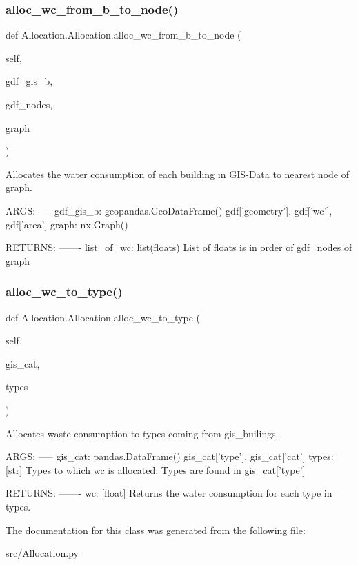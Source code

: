 \subsubsection{\texorpdfstring{alloc\+\_\+wc\+\_\+from\+\_\+b\+\_\+to\+\_\+node()}{alloc\_wc\_from\_b\_to\_node()}}
{\footnotesize\ttfamily def Allocation.\+Allocation.\+alloc\+\_\+wc\+\_\+from\+\_\+b\+\_\+to\+\_\+node (\begin{DoxyParamCaption}\item[{}]{self,  }\item[{}]{gdf\+\_\+gis\+\_\+b,  }\item[{}]{gdf\+\_\+nodes,  }\item[{}]{graph }\end{DoxyParamCaption})}

\begin{DoxyVerb}Allocates the water consumption of each building in GIS-Data to
nearest node of graph.

ARGS:
----
gdf_gis_b: geopandas.GeoDataFrame()
    gdf['geometry'], gdf['wc'], gdf['area']
graph: nx.Graph()

RETURNS:
-------
list_of_wc: list(floats)
    List of floats is in order of gdf_nodes of graph
\end{DoxyVerb}
 \mbox{\label{class_allocation_1_1_allocation_ac8c7c2ea39a0b71a236fa2d7feda2447}} 
\subsubsection{\texorpdfstring{alloc\+\_\+wc\+\_\+to\+\_\+type()}{alloc\_wc\_to\_type()}}
{\footnotesize\ttfamily def Allocation.\+Allocation.\+alloc\+\_\+wc\+\_\+to\+\_\+type (\begin{DoxyParamCaption}\item[{}]{self,  }\item[{}]{gis\+\_\+cat,  }\item[{}]{types }\end{DoxyParamCaption})}

\begin{DoxyVerb}Allocates waste consumption to types coming from gis_builings.

ARGS:
-----
gis_cat: pandas.DataFrame()
    gis_cat['type'], gis_cat['cat']
types: [str]
    Types to which wc is allocated. Types are found in gis_cat['type']

RETURNS:
-------
wc: [float]
    Returns the water consumption for each type in types.
\end{DoxyVerb}
 

The documentation for this class was generated from the following file\+:\begin{DoxyCompactItemize}
\item 
src/Allocation.\+py\end{DoxyCompactItemize}
